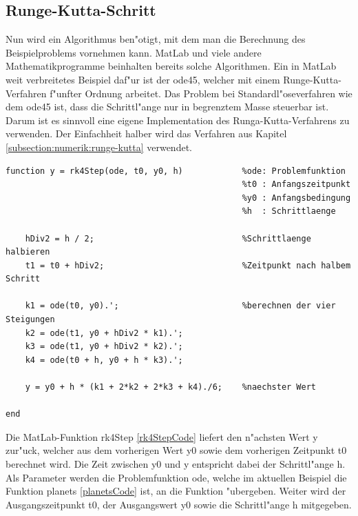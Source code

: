 \begin{refsection}
\section{Runge-Kutta-Schritt\label{section:schrittlaenge:runge-kutta}}


Nun wird ein Algorithmus ben"otigt, mit dem man die Berechnung des Beispielproblems vornehmen kann.
MatLab und viele andere Mathematikprogramme beinhalten bereits solche Algorithmen.
Ein in MatLab weit verbreitetes Beispiel daf"ur ist der ode45, welcher mit einem Runge-Kutta-Verfahren f"unfter Ordnung arbeitet.
Das Problem bei Standardl"oseverfahren wie dem ode45 ist, dass die Schrittl"ange nur in begrenztem Masse steuerbar ist. 
Darum ist es sinnvoll eine eigene Implementation des Runga-Kutta-Verfahrens zu verwenden. Der Einfachheit halber wird das Verfahren aus Kapitel \ref{subsection:numerik:runge-kutta} verwendet. 

\begin{lstlisting}[style=Matlab, caption=Runge-Kutta-Schritt, captionpos=b, label=rk4StepCode] 
function y = rk4Step(ode, t0, y0, h)            %ode: Problemfunktion
                                                %t0 : Anfangszeitpunkt  
                                                %y0 : Anfangsbedingung 
                                                %h  : Schrittlaenge
                                                
    hDiv2 = h / 2;                              %Schrittlaenge halbieren
    t1 = t0 + hDiv2;                            %Zeitpunkt nach halbem Schritt

    k1 = ode(t0, y0).';                         %berechnen der vier Steigungen
    k2 = ode(t1, y0 + hDiv2 * k1).';               
    k3 = ode(t1, y0 + hDiv2 * k2).';
    k4 = ode(t0 + h, y0 + h * k3).';
    
    y = y0 + h * (k1 + 2*k2 + 2*k3 + k4)./6;    %naechster Wert

end

\end{lstlisting}

Die MatLab-Funktion rk4Step \ref{rk4StepCode} liefert den n"achsten Wert y zur"uck, welcher aus dem vorherigen Wert y0 sowie dem vorherigen Zeitpunkt t0 berechnet wird.
Die Zeit zwischen y0 und y entspricht dabei der Schrittl"ange h.
Als Parameter werden die Problemfunktion ode, welche im aktuellen Beispiel die Funktion planets \ref{planetsCode} ist, an die Funktion "ubergeben.
Weiter wird der Ausgangszeitpunkt t0, der Ausgangswert y0 sowie die Schrittl"ange h mitgegeben.
 

\end{refsection}
